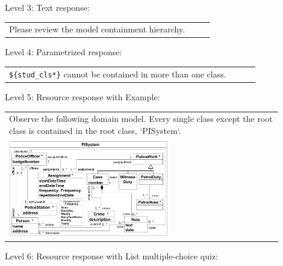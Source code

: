 \noindent Level 3: Text response: \medskip

\begin{tabular}{|p{0.9\linewidth}}
Please review the model containment hierarchy.
\end{tabular} \medskip

\noindent Level 4: Parametrized response: \medskip

\begin{tabular}{|p{0.9\linewidth}}
\verb|${stud_cls*}| cannot be contained in more than one class.
\end{tabular} \medskip

\noindent Level 5: Resource response with Example: \medskip

\begin{tabular}{|p{0.9\linewidth}}
Observe the following domain model. Every single class except the root class is contained in the 
root class, `PISystem`.

\\
\includegraphics[width=0.6\textwidth]{images/PISystem.png}
\end{tabular} \medskip

\noindent Level 6: Resource response with List multiple-choice quiz: \medskip

